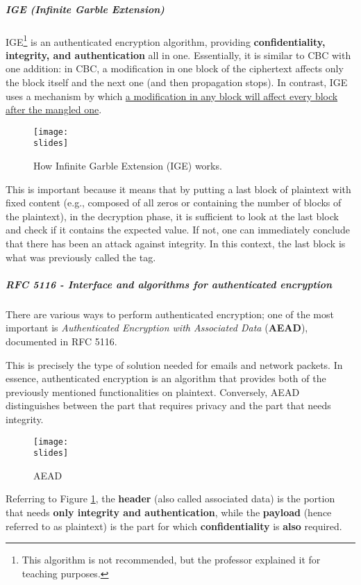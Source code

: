 \subparagraph{IGE (Infinite Garble Extension)}

IGE\footnote{This algorithm is not recommended, but the professor explained it for teaching purposes.} is an authenticated encryption algorithm, providing \textbf{confidentiality, integrity, and authentication} all in one.
Essentially, it is similar to CBC with one addition: in CBC, a modification in one block of the ciphertext affects only the block itself and the next one (and then propagation stops). In contrast, IGE uses a mechanism by which \ul{a modification in any block will affect every block after the mangled one}.

\begin{figure}[h]
    \centering
    \texttt{[image: \\slides]}
    \caption{How Infinite Garble Extension (IGE) works.}
\end{figure}

This is important because it means that by putting a last block of plaintext with fixed content (e.g., composed of all zeros or containing the number of blocks of the plaintext), in the decryption phase, it is sufficient to look at the last block and check if it contains the expected value. If not, one can immediately conclude that there has been an attack against integrity. In this context, the last block is what was previously called the tag.


\subparagraph{RFC 5116 - Interface and algorithms for authenticated encryption}
There are various ways to perform authenticated encryption; one of the most important is \textit{Authenticated Encryption with Associated Data} (\textbf{AEAD}), documented in RFC 5116.

This is precisely the type of solution needed for emails and network packets. In essence, authenticated encryption is an algorithm that provides both of the previously mentioned functionalities on plaintext. Conversely, AEAD distinguishes between the part that requires privacy and the part that needs integrity.
\begin{figure}[h]
    \centering
    \texttt{[image: \\slides]}
    \caption{AEAD}
    \label{fig:AEAD}
\end{figure}

Referring to Figure \ref{fig:AEAD}, the \textbf{header} (also called associated data) is the portion that needs \textbf{only integrity and authentication}, while the \textbf{payload} (hence referred to as plaintext) is the part for which \textbf{confidentiality} is \textbf{also} required.

